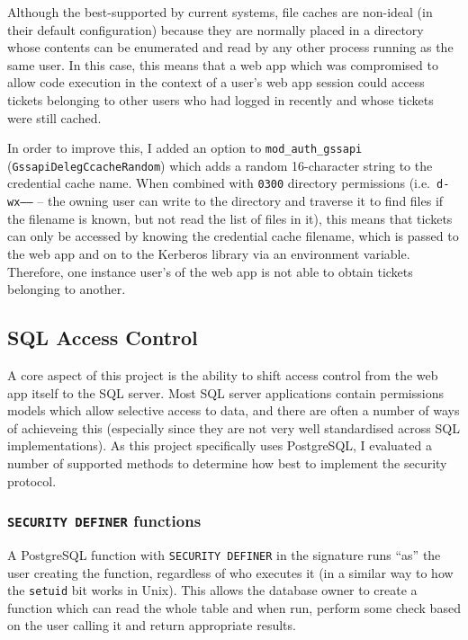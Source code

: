\documentclass{article}
\begin{document}
Although the best-supported by current systems, file caches are non-ideal (in their default configuration) because they are normally placed in a directory whose contents can be enumerated and read by any other process running as the same user. In this case, this means that a web app which was compromised to allow code execution in the context of a user's web app session could access tickets belonging to other users who had logged in recently and whose tickets were still cached.

In order to improve this, I added an option to \verb+mod_auth_gssapi+ (\texttt{GssapiDelegCcacheRandom}) which adds a random 16-character string to the credential cache name. When combined with \texttt{0300} directory permissions (i.e.\ \texttt{d-wx------} -- the owning user can write to the directory and traverse it to find files if the filename is known, but not read the list of files in it), this means that tickets can only be accessed by knowing the credential cache filename, which is passed to the web app and on to the Kerberos library via an environment variable. Therefore, one instance user's of the web app is not able to obtain tickets belonging to another.


\subsection{SQL Access Control}
A core aspect of this project is the ability to shift access control from the web app itself to the SQL server. Most SQL server applications contain permissions models which allow selective access to data, and there are often a number of ways of achieveing this (especially since they are not very well standardised across SQL implementations). As this project specifically uses PostgreSQL, I evaluated a number of supported methods to determine how best to implement the security protocol.

\subsubsection{\texttt{SECURITY DEFINER} functions}
A PostgreSQL function with \texttt{SECURITY DEFINER} in the signature runs ``as'' the user creating the function, regardless of who executes it\cite{postgres-SEC_DEF} (in a similar way to how the \texttt{setuid} bit works in Unix). This allows the database owner to create a function which can read the whole table and when run, perform some check based on the user calling it and return appropriate results.
\end{document}
